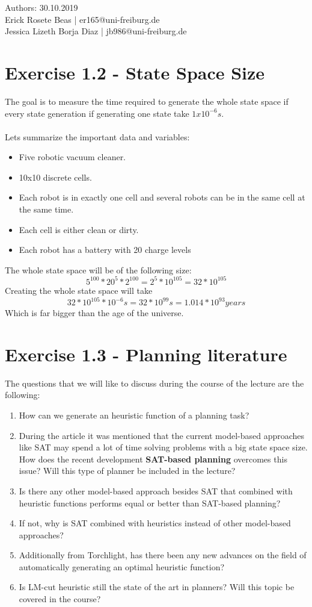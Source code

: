 \documentclass[12pt,a4paper]{article}
\begin{document}
	\begin{flushleft}
		Authors: \hfill 30.10.2019\\
		Erick Rosete Beas | er165@uni-freiburg.de\\
		Jessica Lizeth Borja Diaz | jb986@uni-freiburg.de\\
	\end{flushleft}
	\section*{Exercise 1.2 - State Space Size}
	The goal is to measure the time required to generate the whole state space if every state generation if generating one state
	take $1x10^{-6} s$.\\\\
	Lets summarize the important data and variables:
	\begin{itemize}[noitemsep]
		\item Five robotic vacuum cleaner.
		\item 10x10 discrete cells.
		\item Each robot is in exactly one cell and several robots can be in the same cell at the same time.
		\item Each cell is either clean or dirty.
		\item Each robot has a battery with 20 charge levels
	\end{itemize}
	The whole state space will be of the following size:
	\[5^{100}*20^{5}*2^{100} = 2^{5}*10^{105} = 32*10^{105} \]
	Creating the whole state space will take
	\[32*10^{105}*10^{-6}s = 32*10^{99} s = 1.014*10^{93} years\]
	Which is far bigger than the age of the universe.
	
	
	\section*{Exercise 1.3 - Planning literature}
	The questions that we will like to discuss during the course of the lecture are the following:
	\begin{enumerate}
		\item How can we generate an heuristic function of a planning task?
		\item During the article it was mentioned that the current model-based approaches like SAT may spend a lot of time solving problems with a big state space size. How does the recent development \textbf{SAT-based planning} overcomes this issue? Will this type of planner be included in the lecture?
		\item Is there any other model-based approach besides SAT that combined with heuristic functions performs equal or better than SAT-based planning?
		\item If not, why is SAT combined with heuristics instead of other model-based approaches?
		\item Additionally from Torchlight, has there been any new advances on the field of automatically generating an optimal heuristic function?
		\item Is LM-cut heuristic still the state of the art in planners? Will this topic be covered in the course?
	\end{enumerate}

	
\end{document}

